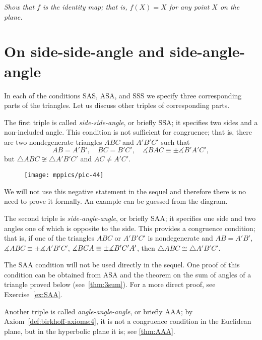 \vskip-2mm
\textit{Show that $f$ is the identity map;
that is, $f(X)=X$ for any point $X$ on the plane.}



\section*{On side-side-angle and side-angle-angle}

In each of the conditions SAS, ASA, and SSS we specify three corresponding parts of the triangles.
Let us discuss other triples of corresponding parts.

The first triple is called {}\emph{side-side-angle}, or briefly SSA;
it specifies two sides and a non-included angle.
This condition is not sufficient for congruence;
that is, there are two nondegenerate triangles $ABC$ and $A'B'C'$ such that
\[AB=A'B',\quad BC=B'C',\quad \measuredangle BAC\equiv\pm \measuredangle B'A'C',\]
but $\triangle ABC\not\cong\triangle A'B'C'$ and $AC\ne A'C'$.

\begin{wrapfigure}{r}{35mm}
\vskip-6mm
\centering
\texttt{[image: mppics/pic-44]}
\end{wrapfigure}

We will not use this negative statement in the sequel and therefore there is no need to prove it formally.
An example can be guessed from the diagram.

The second triple is {}\emph{side-angle-angle}, or briefly SAA;
it specifies one side and two angles one of which is opposite to the side.
This provides a congruence condition; 
that is, if one of the triangles $ABC$ or $A'B'C'$ is nondegenerate and
$AB=A'B'$, $\measuredangle ABC\equiv\pm \measuredangle A'B'C'$, $\measuredangle BCA\z\equiv\pm \measuredangle B'C'A'$,
then $\triangle ABC\cong\triangle A'B'C'$.

The SAA condition will not be used directly in the sequel.
One proof of this condition can be obtained from ASA and the theorem on the sum of angles of a triangle proved below (see~\ref{thm:3sum}). 
For a more direct proof, see Exercise~\ref{ex:SAA}.

Another triple is called {}\emph{angle-angle-angle}, or briefly AAA;
by Axiom~\ref{def:birkhoff-axioms:4}, it is not a congruence condition in the Euclidean plane, but in the hyperbolic plane it is; see \ref{thm:AAA}.


